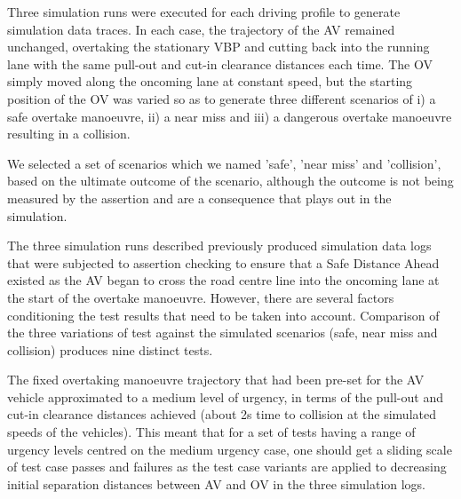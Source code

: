 Three simulation runs were executed for each driving profile to generate simulation data traces. 
%
In each case, the trajectory of the AV remained unchanged, overtaking the stationary VBP and cutting back into the running lane with the same pull-out and cut-in clearance distances each time. The OV simply moved along the oncoming lane at constant speed, but the starting position of the OV was varied so as to generate three different scenarios of i) a safe overtake manoeuvre, ii) a near miss and iii) a dangerous overtake manoeuvre resulting in a collision.


We selected a set of scenarios which we named 'safe', 'near miss' and 'collision', based on the ultimate outcome of the scenario, although the outcome is not being measured by the assertion and are a consequence that plays out in the simulation.


The three simulation runs described previously produced simulation data logs that were subjected to assertion checking to ensure that a Safe Distance Ahead existed as the AV began to cross the road centre line into the oncoming lane at the start of the overtake manoeuvre. However, there are several factors conditioning the test results that need to be taken into account. 
%
Comparison of the three variations of test against the simulated scenarios (safe, near miss and collision) produces nine distinct tests. 

The fixed overtaking manoeuvre trajectory that had been pre-set for the AV vehicle approximated to a medium level of urgency, in terms of the pull-out and cut-in clearance distances achieved (about 2s time to collision at the simulated speeds of the vehicles). This meant that for a set of tests having a range of urgency levels centred on the medium urgency case, one should get a sliding scale of test case passes and failures as the test case variants are applied to decreasing initial separation distances between AV and OV in the three simulation logs. 


